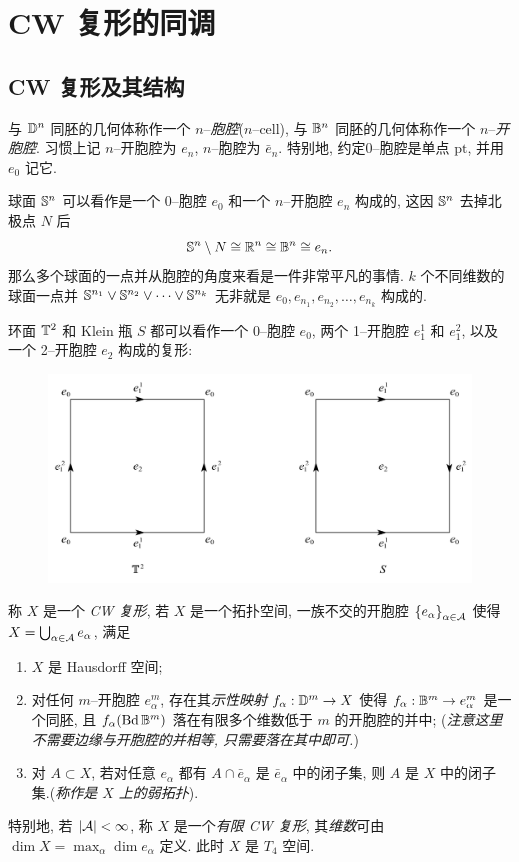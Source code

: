 
\section{CW 复形的同调}

\subsection{CW 复形及其结构}

与 $ \D^n $ 同胚的几何体称作一个 $ n $--\emph{胞腔}($ n $--cell), 与 $ \B^n $ 同胚的几何体称作一个 $ n $--\emph{开胞腔}. 习惯上记 $ n $--开胞腔为 $ e_n $, $ n $--胞腔为 $ \bar{e}_n $. 特别地, 约定0--胞腔是单点 $ \mathrm{pt} $, 并用 $ e_0 $ 记它.

\begin{Example}
	球面 $ \S^n $ 可以看作是一个 0--胞腔 $ e_0 $ 和一个 $ n $--开胞腔 $ e_n $ 构成的, 这因 $ \S^n $ 去掉北极点 $ N $ 后
	\[
		\S^n\sm N\cong\R^n\cong\B^n\cong e_n.
	\]
	那么多个球面的一点并从胞腔的角度来看是一件非常平凡的事情. $ k $ 个不同维数的球面一点并 $ \S^{n_1}\vee\S^{n_2}\vee\dots\vee\S^{n_k} $ 无非就是 $ e_0,e_{n_1},e_{n_2},\dots,e_{n_k} $ 构成的.
\end{Example}

\begin{Example}
	环面 $ \T^2 $ 和 Klein 瓶 $ S $ 都可以看作一个 0--胞腔 $ e_0 $, 两个 1--开胞腔 $ e_1^1 $ 和 $ e_1^2 $, 以及一个 2--开胞腔 $ e_2 $ 构成的复形:
	\begin{figure}[htbp]
		\centering
		\includegraphics[width=0.4\linewidth]{figures/Sec12-1.png}
	\end{figure}
\end{Example}

\begin{Definition}[CW 复形]
	称 $ X $ 是一个 \emph{CW 复形}, 若 $ X $ 是一个拓扑空间, 一族不交的开胞腔 $ \set{e_\alpha}_{\alpha\in\CA} $ 使得 $ X=\bigcup_{\alpha\in\CA}e_\alpha $, 满足
	\begin{enumerate}
		\item $ X $ 是 Hausdorff 空间;
		\item 对任何 $ m $--开胞腔 $ e_\alpha^m $, 存在其\emph{示性映射} $ f_\alpha : \D^m\to X $ 使得 $ f_\alpha : \B^m\to e_\alpha^m $ 是一个同胚, 且 $ f_\alpha(\Bd\B^m) $ 落在有限多个维数低于 $ m $ 的开胞腔的并中; (\textit{注意这里不需要边缘与开胞腔的并相等, 只需要落在其中即可.})
		\item 对 $ A\subset X $, 若对任意 $ e_\alpha $ 都有 $ A\cap \bar{e}_\alpha $ 是 $ \bar{e}_\alpha $ 中的闭子集, 则 $ A $ 是 $ X $ 中的闭子集.(\textit{称作是 $ X $ 上的弱拓扑}).
	\end{enumerate}
	特别地, 若 $ \abs{\CA}<\infty $, 称 $ X $ 是一个\emph{有限 CW 复形}, 其\emph{维数}可由 $ \dim X=\max_{\alpha}\dim e_\alpha $ 定义. 此时 $ X $ 是 $ T_4 $ 空间.
\end{Definition}

